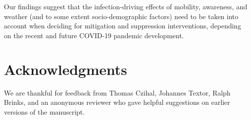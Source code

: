 \documentclass[]{elsarticle} %
\begin{document}
Our findings suggest that the infection-driving effects of mobility, awareness, and weather (and to some extent socio-demographic factors) need to be taken into account when deciding for mitigation and suppression interventions, depending on the recent and future COVID-19 pandemic development.

\hypertarget{acknowledgments}{%
\section*{Acknowledgments}\label{acknowledgments}}

We are thankful for feedback from Thomas Czihal, Johannes Textor, Ralph Brinks, and an anonymous reviewer who gave helpful suggestions on earlier versions of the manuscript.

\renewcommand\refname{References}

\end{document}
